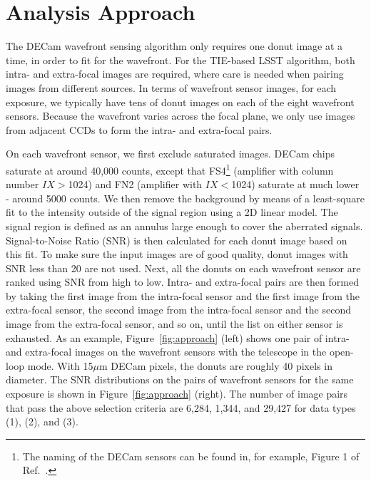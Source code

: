 \documentclass[]{spie}  %
\begin{document}
\section{Analysis Approach}
\label{sec:approach}

The DECam wavefront sensing algorithm only requires one donut image at a time, in order to fit for the wavefront. For the TIE-based LSST algorithm, both intra- and extra-focal images are required, where care is needed when pairing images from different sources.
In terms of wavefront sensor images, for each exposure, we typically have tens of donut images on each of the eight wavefront sensors. Because the wavefront varies across the focal plane, we only use images from adjacent CCDs to form the intra- and extra-focal pairs.

On each wavefront sensor, we first exclude saturated images.
DECam chips saturate at around 40,000 counts,
except that FS4\footnote{The naming of the DECam sensors can be found in, for example, Figure 1 of Ref.~.}
(amplifier with column number  $IX>$1024) and FN2 (amplifier with $IX<$1024) saturate at much lower - around 5000 counts.
We then remove 
the background by means of a least-square fit to the intensity outside of the signal region using a 2D linear model. The signal region is defined as an annulus large enough to cover the aberrated signals.
Signal-to-Noise Ratio (SNR) is then calculated for each donut image based on this fit.
To make sure the input images are of good quality, donut images with SNR less than 20 are not used.
Next, all the donuts on each wavefront sensor are ranked using SNR from high to low.
Intra- and extra-focal pairs are then formed by taking the first image from the intra-focal sensor and the first image from the extra-focal sensor, the second image from the intra-focal sensor and the second image from the extra-focal sensor, and so on, until the list on either sensor is exhausted.
As an example, Figure~\ref{fig:approach} (left) shows one pair of intra- and extra-focal images on the wavefront sensors with the telescope in the open-loop mode. 
With 15$\mu$m DECam pixels, the donuts are roughly 40 pixels in diameter.
The SNR distributions on the pairs of wavefront sensors for the same exposure is shown in Figure~\ref{fig:approach} (right).
The number of image pairs that pass the above selection criteria are 6,284, 1,344, and 29,427 for data types (1), (2), and (3).
\end{document}
